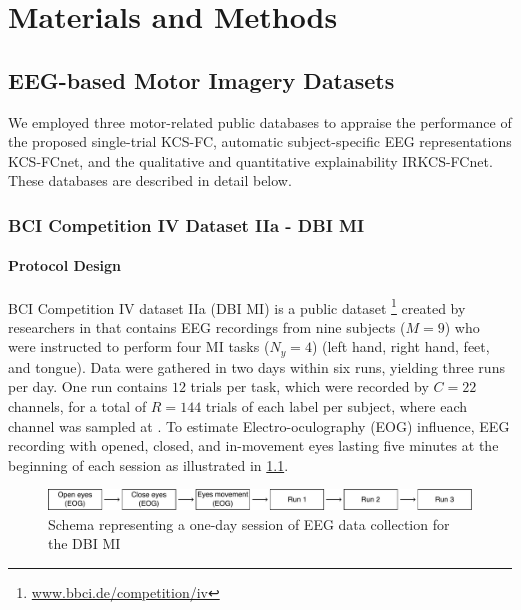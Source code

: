 \chapter{Materials and Methods}


\section{EEG-based Motor Imagery Datasets}\label{sec:dataset}

We employed three motor-related public databases to appraise the performance of the proposed single-trial KCS-FC, automatic subject-specific EEG representations KCS-FCnet, and the qualitative and quantitative explainability IRKCS-FCnet. These databases are described in detail below.

\subsection{BCI Competition IV Dataset IIa - DBI MI}

\subsubsection{Protocol Design}

BCI Competition IV dataset IIa (DBI MI) is a public dataset \footnote{\url{www.bbci.de/competition/iv}} created by researchers in \cite{brunner2008bci} that contains EEG recordings from nine subjects ($M=9$) who were instructed to perform four MI tasks ($N_y=4$) (left hand, right hand, feet, and tongue). Data were gathered in two days within six runs, yielding three runs per day. One run contains $12$ trials per task, which were recorded by $C=22$ channels, for a total of $R=144$ trials of each label per subject, where each channel was sampled at . To estimate Electro-oculography (EOG) influence, EEG recording with opened, closed, and in-movement eyes lasting five minutes at the beginning of each session as illustrated in \cref{fig:bci2a_schema}.

\begin{figure}[!h]
  \centering
  \includegraphics[width=\linewidth]{Figures/preliminaries/BCI2a_schema.pdf}
  \caption{Schema representing a one-day session of EEG data collection for the DBI MI \label{fig:bci2a_schema}}
\end{figure}

